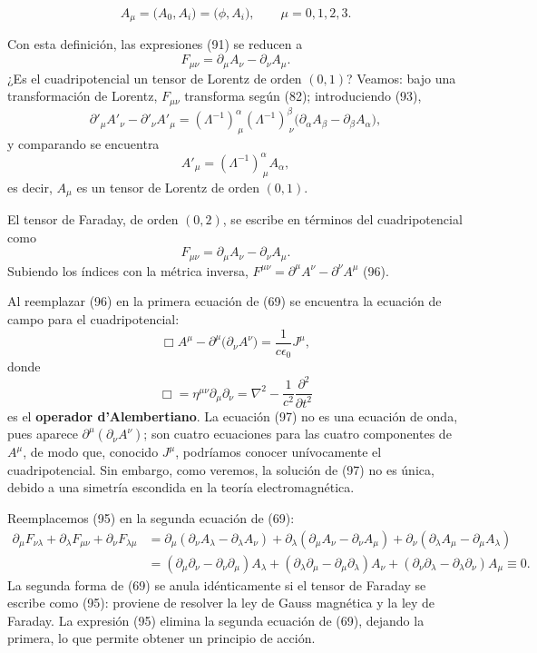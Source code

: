 \begin{definicion}
\[
A_\mu = \big(A_0,A_i\big)=\big(\phi,A_i\big), \qquad \mu=0,1,2,3.
\tag{92}
\]
\end{definicion}

Con esta definición, las expresiones (91) se reducen a
\[
F_{\mu\nu}=\partial_\mu A_\nu-\partial_\nu A_\mu . \tag{93}
\]
¿Es el cuadripotencial un tensor de Lorentz de orden $(0,1)$?
Veamos: bajo una transformación de Lorentz, $F_{\mu\nu}$ transforma según
(82); introduciendo (93),
\[
\partial'_\mu A'_\nu-\partial'_\nu A'_\mu=(\Lambda^{-1})^\alpha_{\ \mu}
(\Lambda^{-1})^\beta_{\ \nu}\big(\partial_\alpha A_\beta-\partial_\beta
A_\alpha\big),
\]
y comparando se encuentra
\[
A'_\mu=(\Lambda^{-1})^\alpha_{\ \mu}A_\alpha, \tag{94}
\]
es decir, $A_\mu$ es un tensor de Lorentz de orden $(0,1)$.

\begin{definicion}
El tensor de Faraday, de orden $(0,2)$, se escribe en términos del
cuadripotencial como
\[
F_{\mu\nu}=\partial_\mu A_\nu-\partial_\nu A_\mu . \tag{95}
\]
Subiendo los índices con la métrica inversa,
$F^{\mu\nu}=\partial^\mu A^\nu-\partial^\nu A^\mu$ (96).
\end{definicion}

Al reemplazar (96) en la primera ecuación de (69) se encuentra la
ecuación de campo para el cuadripotencial:
\[
\Box A^\mu-\partial^\mu\big(\partial_\nu A^\nu\big)=\frac{1}{c\epsilon_0}
J^\mu, \tag{97}
\]
donde
\[
\Box=\eta^{\mu\nu}\partial_\mu\partial_\nu=\nabla^2-\frac{1}{c^2}
\frac{\partial^2}{\partial t^2} \tag{98}
\]
es el \textbf{operador d'Alembertiano}. La ecuación (97) no es una
ecuación de onda, pues aparece $\partial^\mu(\partial_\nu A^\nu)$; son
cuatro ecuaciones para las cuatro componentes de $A^\mu$, de modo que,
conocido $J^\mu$, podríamos conocer unívocamente el cuadripotencial. Sin
embargo, como veremos, la solución de (97) no es única, debido a una
simetría escondida en la teoría electromagnética.

Reemplacemos (95) en la segunda ecuación de (69):
\[
\begin{aligned}
\partial_\mu F_{\nu\lambda}+\partial_\lambda F_{\mu\nu}+\partial_\nu
F_{\lambda\mu} &= \partial_\mu(\partial_\nu A_\lambda-\partial_\lambda
A_\nu)+\partial_\lambda(\partial_\mu A_\nu-\partial_\nu A_\mu)+\partial_\nu
(\partial_\lambda A_\mu-\partial_\mu A_\lambda)\\
&= (\partial_\mu\partial_\nu-\partial_\nu\partial_\mu)A_\lambda+
(\partial_\lambda\partial_\mu-\partial_\mu\partial_\lambda)A_\nu+
(\partial_\nu\partial_\lambda-\partial_\lambda\partial_\nu)A_\mu \equiv 0.
\end{aligned} \tag{99}
\]
La segunda forma de (69) se anula idénticamente si el tensor de Faraday
se escribe como (95): proviene de resolver la ley de Gauss magnética y la
ley de Faraday. La expresión (95) elimina la segunda ecuación de (69),
dejando la primera, lo que permite obtener un principio de acción.

